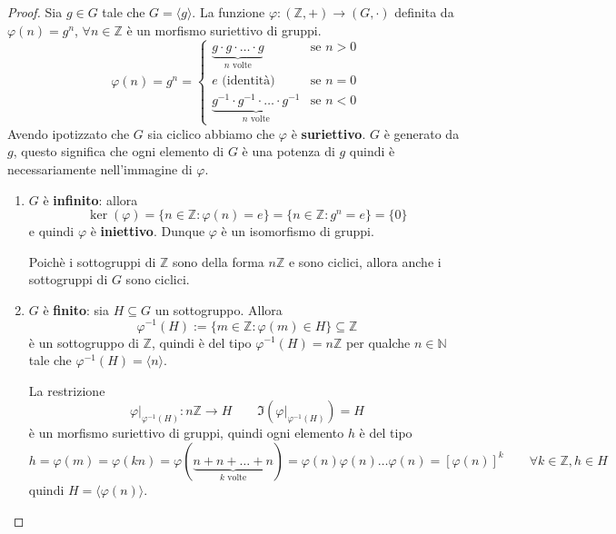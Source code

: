 \documentclass[../main.tex]{subfiles}
\begin{document}
\begin{proof}
    Sia $g \in G$ tale che $G = \langle g \rangle$. La funzione $\varphi: (\mathbb{Z} , +) \rightarrow (G, \cdot)$ definita da $\varphi(n) = g^n$, $\forall n \in \mathbb{Z}$ è un morfismo suriettivo di gruppi.
    \[
        \varphi(n) = g^n = \begin{cases*}
            \underbrace{g\cdot g \cdot \ldots \cdot g}_{n \text{ volte}}                 & \text{se } n > 0 \\
            e \text{ (identità)}                                                         & \text{se } n = 0 \\
            \underbrace{g^{-1} \cdot g^{-1} \cdot \ldots \cdot g^{-1}}_{n \text{ volte}} & \text{se } n < 0
        \end{cases*}
    \]
    Avendo ipotizzato che $G$ sia ciclico abbiamo che $\varphi$ è \textbf{suriettivo}.
    $G$ è generato da $g$, questo significa che ogni elemento di $G$ è una potenza di $g$ quindi è necessariamente nell’immagine di $\varphi$.
    \begin{enumerate}[label=\alph*)]
        \item $G$ è \textbf{infinito}: allora
              \[
                  \ker(\varphi) = \{n \in \mathbb{Z} : \varphi(n) = e\} = \{n \in \mathbb{Z} : g^n = e\}  = \{0\}
              \]
              e quindi $\varphi$ è \textbf{iniettivo}. Dunque $\varphi$ è un isomorfismo di gruppi.

              Poichè i sottogruppi di $\mathbb{Z}$ sono della forma $n \mathbb{Z}$ e sono ciclici, allora anche i sottogruppi di $G$ sono ciclici.
        \item $G$ è \textbf{finito}: sia $H \subseteq G$ un sottogruppo. Allora
              \[
                  \varphi^{-1}(H) := \{m \in \mathbb{Z} : \varphi(m) \in H\} \subseteq \mathbb{Z}
              \]
              è un sottogruppo di $\mathbb{Z}$, quindi è del tipo $ \varphi^{-1}(H) = n \mathbb{Z}$ per qualche $n \in \mathbb{N}$ tale che $\varphi^{-1}(H)= \langle n \rangle$.

              La restrizione
              \[
                  \varphi \big|_{\varphi^{-1}(H)}:  n \mathbb{Z} \rightarrow H \qquad \Im\left(\varphi \big|_{\varphi^{-1}(H)}\right) = H
              \]
              è un morfismo suriettivo di gruppi, quindi ogni elemento $h$ è del tipo
              \[
                  h = \varphi(m) = \varphi(kn) = \varphi(\underbrace{n+n+\ldots+n}_{k \text{ volte}}) = \varphi(n) \varphi(n) \ldots \varphi(n) = [\varphi(n)]^k \qquad \forall k \in \mathbb{Z}, h \in H
              \]
              quindi $H = \langle \varphi(n) \rangle$.
    \end{enumerate}


\end{proof}
\end{document}
